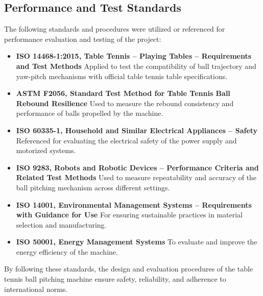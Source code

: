 \documentclass[12pt]{article}
\begin{document}
\subsection{Performance and Test Standards}
The following standards and procedures were utilized or referenced for performance evaluation and testing of the project:
\begin{itemize}
    \item \textbf{ISO 14468-1:2015, Table Tennis – Playing Tables – Requirements and Test Methods}
    Applied to test the compatibility of ball trajectory and yaw-pitch mechanisms with official table tennis table specifications.
    
    \item \textbf{ASTM F2056, Standard Test Method for Table Tennis Ball Rebound Resilience}
    Used to measure the rebound consistency and performance of balls propelled by the machine.
    
    \item \textbf{ISO 60335-1, Household and Similar Electrical Appliances – Safety}
    Referenced for evaluating the electrical safety of the power supply and motorized systems.
    
    \item \textbf{ISO 9283, Robots and Robotic Devices – Performance Criteria and Related Test Methods}
    Used to measure repeatability and accuracy of the ball pitching mechanism across different settings.
    
    \item \textbf{ISO 14001, Environmental Management Systems – Requirements with Guidance for Use}
    For ensuring sustainable practices in material selection and manufacturing.
    
    \item \textbf{ISO 50001, Energy Management Systems}
    To evaluate and improve the energy efficiency of the machine.
\end{itemize}
By following these standards, the design and evaluation procedures of the table tennis ball pitching machine ensure safety, reliability, and adherence to international norms.
\end{document}
